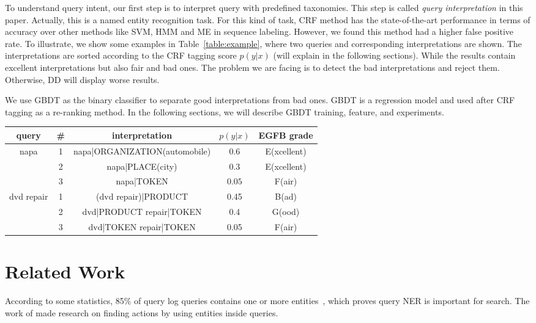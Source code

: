 \documentclass{acm_proc_article-sp}
\begin{document}
To understand query intent, our first step is to interpret query with predefined taxonomies. This step is called \emph{query interpretation} in this paper. Actually, this is a named entity recognition task. For this kind of task,  CRF method has the state-of-the-art performance in terms of accuracy over other methods like SVM, HMM and ME in sequence labeling.
However, we found this method had a higher false positive rate. To illustrate, we show some examples in Table~\ref{table:example}, where two queries and corresponding interpretations are shown. The interpretations are sorted according to the CRF tagging score $p(y|x)$ (will explain in the following sections). While the results contain excellent interpretations but also fair and bad ones. The problem we are facing is to detect the bad interpretations and reject them. Otherwise, DD will display worse results. 

We use GBDT\cite{Friedman:2002, Ye:2009} as the binary classifier to separate good interpretations from bad ones. GBDT is a regression model and  used after CRF tagging as a re-ranking method.
In the following sections, we will describe GBDT training, feature, and experiments. 










\begin{table*}
\begin{center}
\begin{tabular}{|c|c|c|c|c|} \hline
query & \# & interpretation & $p(y|x)$ & EGFB grade \\ \hline
napa & 1 &napa|ORGANIZATION(automobile) & 0.6 & E(xcellent)\\
& 2 &napa|PLACE(city) & 0.3 & E(xcellent) \\
& 3 &napa|TOKEN & $0.05$ & F(air) \\ \hline
dvd repair & 1 & (dvd repair)|PRODUCT & 0.45 & B(ad) \\
& 2 & dvd|PRODUCT repair|TOKEN & 0.4 & G(ood) \\
& 3 & dvd|TOKEN repair|TOKEN & 0.05 & F(air) \\
\hline
\end{tabular}
\caption{From CRF tagging: query interpretation, tagging scores and editorial evaluation grades}
\label{table:example}
\end{center}
\end{table*}

\section{Related Work}
According to some statistics, 85\% of query log queries contains one or more entities~\cite{Lin:2012}, which proves query NER is important for search. The work of \cite{Lin:2012} made research on finding actions by using entities inside queries.
\end{document}
